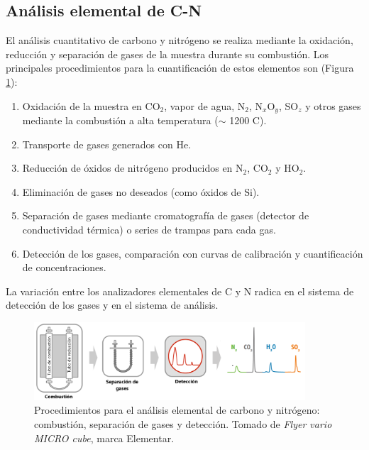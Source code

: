	\subsection{Análisis elemental de C-N}\label{SubSec-CN-Intro}
El análisis cuantitativo de carbono y nitrógeno se realiza mediante la oxidación, reducción y separación de gases de la muestra durante su combustión. Los principales procedimientos para la cuantificación de estos elementos son  \cite{smith2003soil, danovaro2009methods} (Figura \ref{Fig-CN-Esquema}):
\begin{enumerate}
\item Oxidación de la muestra en CO$_2$, vapor de agua, N$_2$, N$_x$O$_y$, SO$_z$ y otros gases mediante la combustión a alta temperatura ($\sim$ 1200 \grados C).
\item Transporte de gases generados con He. 
\item Reducción de óxidos de nitrógeno producidos en N$_2$, CO$_2$ y HO$_2$. 
\item Eliminación de gases no deseados (como óxidos de Si).
\item Separación de gases mediante cromatografía de gases (detector de conductividad térmica) o series de trampas para cada gas.
\item Detección de los gases, comparación con curvas de calibración y cuantificación de concentraciones.
\end{enumerate}
La variación entre los analizadores elementales de C y N radica en el sistema de detección de los gases y en el sistema de análisis.
\begin{figure}[h]
\centering
\includegraphics[width=0.9\textwidth]{Imagenes/C-N-Detection-2.png}
\caption{Procedimientos para el análisis elemental de carbono y nitrógeno: combustión, separación de gases y detección. Tomado de \textit{Flyer vario MICRO cube}, marca Elementar.}\label{Fig-CN-Esquema}
\end{figure}

